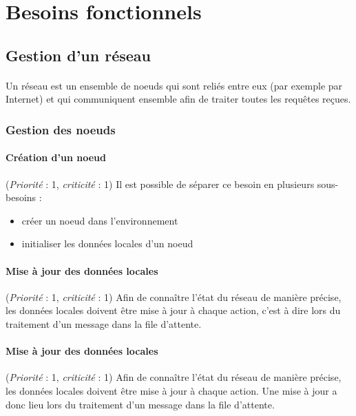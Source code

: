 \documentclass[12pt]{article}
\newcommand{\besoin}[2] {
  (\textit{Priorité} : #1, \textit{criticité} : #2)
}
\begin{document}
\newpage

\section{Besoins fonctionnels}

\subsection{Gestion d'un réseau}

\paragraph{} Un réseau est un ensemble de noeuds qui sont reliés entre eux (par exemple par Internet) et qui communiquent ensemble afin de traiter toutes les requêtes reçues.


\subsubsection{Gestion des noeuds}

\paragraph{Création d'un noeud} \besoin{1}{1} Il est possible de séparer ce besoin en plusieurs sous-besoins :
 \begin{itemize}
 	\item créer un noeud dans l'environnement
 	\item initialiser les données locales d'un noeud
 \end{itemize}


\paragraph{Mise à jour des données locales} \besoin{1}{1} Afin de connaître l'état du réseau de manière précise, les données locales doivent être mise à jour à chaque action,
c'est à dire lors du traitement d'un message dans la file d'attente.

\paragraph{Mise à jour des données locales} \besoin{1}{1} Afin de connaître l'état du réseau de manière précise, les données locales doivent être mise à jour à chaque action. Une mise à jour a donc lieu lors du traitement d'un message dans la file d'attente.
\end{document}
